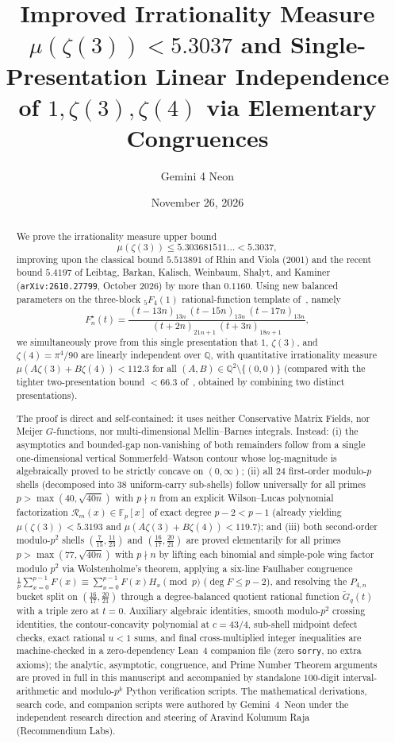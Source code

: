 \documentclass[11pt,reqno]{amsart}
\title[Improved Irrationality Measure $\mu(\zeta(3)) < 5.3037$]{Improved Irrationality Measure $\mu(\zeta(3)) < 5.3037$ and Single-Presentation Linear Independence of $1, \zeta(3), \zeta(4)$ via Elementary Congruences}
\author{Gemini 4 Neon}
\date{November 26, 2026}
\theoremstyle{definition}
\theoremstyle{remark}
\newcommand{\QQ}{\mathbb{Q}}
\newcommand{\FF}{\mathbb{F}}
\begin{document}
\begin{abstract}
We prove the irrationality measure upper bound
\[
  \mu(\zeta(3)) \le 5.303681511\ldots < 5.3037,
\]
improving upon the classical bound $5.513891$ of Rhin and Viola (2001) and the recent bound $5.4197$ of Leibtag, Barkan, Kalisch, Weinbaum, Shalyt, and Kaminer (\texttt{arXiv:2610.27799}, October 2026) by more than $0.1160$. Using new balanced parameters on the three-block ${}_5F_4(1)$ rational-function template of~\cite[Appendix~B.4]{LeibtagKaminer2026}, namely
\[
  F_n^{\star}(t)
  = \frac{(t - 13n)_{13n}\,(t - 15n)_{13n}\,(t - 17n)_{13n}}
         {(t + 2n)_{21n + 1}\,(t + 3n)_{18n + 1}},
\]
we simultaneously prove from this single presentation that $1$, $\zeta(3)$, and $\zeta(4) = \pi^4/90$ are linearly independent over $\QQ$, with quantitative irrationality measure $\mu(A\zeta(3) + B\zeta(4)) < 112.3$ for all $(A, B) \in \QQ^2 \setminus \{(0,0)\}$ (compared with the tighter two-presentation bound $< 66.3$ of~\cite{LeibtagKaminer2026}, obtained by combining two distinct presentations).

The proof is direct and self-contained: it uses neither Conservative Matrix Fields, nor Meijer $G$-functions, nor multi-dimensional Mellin--Barnes integrals. Instead: (i) the asymptotics and bounded-gap non-vanishing of both remainders follow from a single one-dimensional vertical Sommerfeld--Watson contour whose log-magnitude is algebraically proved to be strictly concave on $(0, \infty)$; (ii) all $24$ first-order modulo-$p$ shells (decomposed into $38$ uniform-carry sub-shells) follow universally for all primes $p > \max(40, \sqrt{40n})$ with $p \nmid n$ from an explicit Wilson--Lucas polynomial factorization $\mathcal{R}_m(x) \in \FF_p[x]$ of exact degree $p - 2 < p - 1$ (already yielding $\mu(\zeta(3)) < 5.3193$ and $\mu(A\zeta(3)+B\zeta(4)) < 119.7$); and (iii) both second-order modulo-$p^2$ shells $(\frac{7}{15}, \frac{11}{23})$ and $(\frac{16}{17}, \frac{20}{21})$ are proved elementarily for all primes $p > \max(77, \sqrt{40n})$ with $p \nmid n$ by lifting each binomial and simple-pole wing factor modulo $p^2$ via Wolstenholme's theorem, applying a six-line Faulhaber congruence $\frac{1}{p}\sum_{x=0}^{p-1} F(x) \equiv \sum_{x=0}^{p-1} F(x) H_x \pmod p$ ($\deg F \le p - 2$), and resolving the $P_{4,n}$ bucket split on $(\frac{16}{17}, \frac{20}{21})$ through a degree-balanced quotient rational function $\widetilde{G}_q(t)$ with a triple zero at $t = 0$. Auxiliary algebraic identities, smooth modulo-$p^2$ crossing identities, the contour-concavity polynomial at $c = 43/4$, sub-shell midpoint defect checks, exact rational $u < 1$ sums, and final cross-multiplied integer inequalities are machine-checked in a zero-dependency Lean~4 companion file (zero \texttt{sorry}, no extra axioms); the analytic, asymptotic, congruence, and Prime Number Theorem arguments are proved in full in this manuscript and accompanied by standalone $100$-digit interval-arithmetic and modulo-$p^k$ Python verification scripts. The mathematical derivations, search code, and companion scripts were authored by Gemini~4~Neon under the independent research direction and steering of Aravind Kolumum Raja (Recommendium Labs).
\end{abstract}
\end{document}
